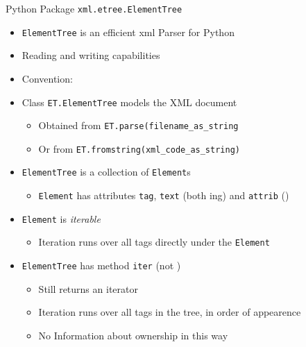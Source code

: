 \begin{frame}{Python Package \texttt{xml.etree.ElementTree}}
%
\begin{itemize}
\item \texttt{ElementTree} is an efficient xml Parser for Python
\item Reading and writing capabilities
\item Convention: 
\pause
\item Class \texttt{ET.ElementTree} models the XML document
	\begin{itemize}
	\item Obtained from \texttt{ET.parse(filename\_as\_string}
	\item Or from \texttt{ET.fromstring(xml\_code\_as\_string)}
	\end{itemize}
\pause
\item \texttt{ElementTree} is a collection of \texttt{Element}s
	\begin{itemize}
	\item \texttt{Element} has attributes \texttt{tag}, \texttt{text} (both ing) and \texttt{attrib} ()
	\end{itemize}
\pause
\item \texttt{Element} is \emph{iterable}
	\begin{itemize}
	\item Iteration runs over all tags directly under the \texttt{Element}
	\end{itemize}
\pause
\item \texttt{ElementTree} has method \texttt{iter} (not )
	\begin{itemize}
	\item Still returns an iterator
	\item Iteration runs over all tags in the tree, in order of appearence
	\item No Information about ownership in this way
	\end{itemize}
\end{itemize}
%
\end{frame}


